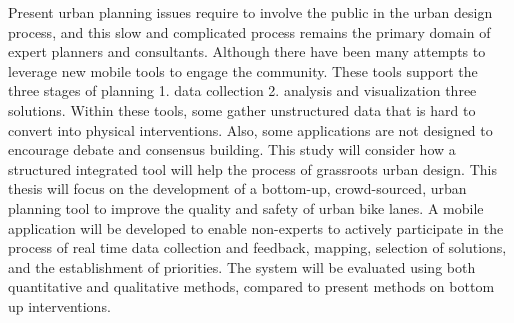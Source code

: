 % 
% 
%



Present urban planning issues require to involve the public in the urban design process, and this slow and complicated process remains the primary domain of expert planners and consultants.
Although there have been many attempts to leverage new mobile tools to engage the community.
These tools support the three stages of planning 1. data collection 2. analysis and visualization three solutions.  
Within these tools, some gather unstructured data that is hard to convert into physical interventions. Also, some applications are not designed to encourage debate and consensus building. This study will consider how a structured integrated tool will help the process of grassroots urban design.
This thesis will focus on the development of a bottom-up, crowd-sourced, urban planning tool to improve the quality and safety of urban bike lanes. A mobile application will be developed to enable non-experts to actively participate in the process of real time data collection and feedback, mapping, selection of solutions, and the establishment of priorities. The system will be evaluated using both quantitative and qualitative methods, compared to present methods on bottom up interventions.
